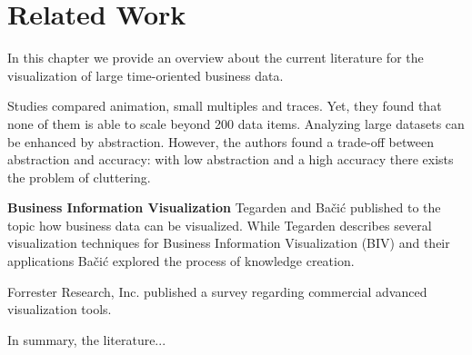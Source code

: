 \chapter{Related Work}
\label{chap:related Work}
In this chapter we provide an overview about the current literature for the visualization of large time-oriented business data. 




Studies compared animation, small multiples and traces. Yet, they found that none of them is able to scale beyond 200 data items\cite{Robertson2013}. Analyzing large datasets can be enhanced by abstraction. However, the authors found a trade-off between abstraction and accuracy: with low abstraction and a high accuracy there exists the problem of cluttering.


\textbf{Business Information Visualization} Tegarden and Bačić\cite{Bacic,Bacic2013,Bacic2012TheCreation,Tegarden1999} published to the topic how business data can be visualized. While Tegarden describes several visualization techniques for Business Information Visualization (BIV) and their applications Bačić explored the process of knowledge creation\cite{Bacic2012}.

Forrester Research, Inc. published a survey\cite{Evelson2012} regarding commercial advanced visualization tools.

In summary, the literature...
